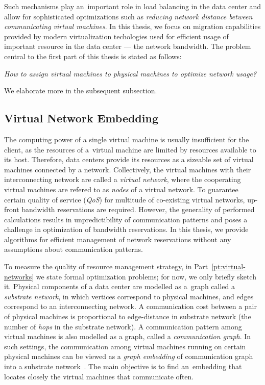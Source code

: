 Such mechanisms play an~important role in load balancing in the data center and allow for sophisticated optimizations such as \emph{reducing network distance between communicating virtual machines}.
In this thesis, we focus on migration capabilities provided by modern virtualization techologies used for efficient usage of important resource in the data center --- the network bandwidth.
The problem central to the first part of this thesis is stated as follows:

\begin{center}
  \emph{How to assign virtual machines to physical machines to optimize network
  usage?}
\end{center}
We elaborate more in the subsequent subsection.

\subsection{Virtual Network Embedding}

The computing power of a single virtual machine is usually insufficient for the client, as the resources of a~virtual machine are limited by resources available to its host.
Therefore, data centers provide its resources as a sizeable set of virtual machines connected by a network.
Collectively, the virtual machines with their interconnecting network are called a \emph{virtual network}, where the cooperating virtual machines are refered to as \emph{nodes} of a virtual network.
To guarantee certain quality of service (\emph{QoS}) for multitude of co-existing virtual networks, up-front bandwidth reservations are required.
However, the generality of performed calculations results in unpredictibility of communication patterns and poses a challenge in optimization of bandwidth reservations.
In this thesis, we provide algorithms for efficient management of network reservations without any assumptions about communication patterns.

To measure the quality of resource management strategy, in Part~\ref{pt:virtual-networks} we state formal optimization problems; for now, we only briefly sketch it.
Physical components of a data center are modelled as a~graph called a \emph{substrate network}, in which vertices correspond to physical machines, and edges correspond to an interconnecting network.
A communication cost between a pair of physical machines is proportional to edge-distance in substrate network (the number of \emph{hops} in the substrate network).
A communication pattern among virtual machines is also modelled as a graph, called a \emph{communication graph}.
In such settings, the communication among virtual machines running on certain physical machines can be viewed as a \emph{graph embedding} of communication graph into a substrate network~\cite{gupta2001provisioning}.
The main objective is to find an~embedding that locates closely the virtual machines that communicate often.

